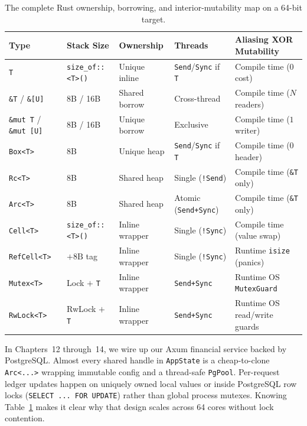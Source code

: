 \begin{table}[H]
\centering
\footnotesize
\setlength{\tabcolsep}{4pt}
\begin{tabular}{@{}llllp{4.3cm}@{}}
\toprule
\textbf{Type} & \textbf{Stack Size} & \textbf{Ownership} & \textbf{Threads} & \textbf{Aliasing XOR Mutability} \\
\midrule
\texttt{T} & \texttt{size\_of::<T>()} & Unique inline & \texttt{Send}/\texttt{Sync} if \texttt{T} & Compile time (0 cost) \\
\texttt{\&T} / \texttt{\&[U]} & 8B / 16B & Shared borrow & Cross-thread & Compile time ($N$ readers) \\
\texttt{\&mut T} / \texttt{\&mut [U]} & 8B / 16B & Unique borrow & Exclusive & Compile time ($1$ writer) \\
\texttt{Box<T>} & 8B & Unique heap & \texttt{Send}/\texttt{Sync} if \texttt{T} & Compile time (0 header) \\
\texttt{Rc<T>} & 8B & Shared heap & Single (\texttt{!Send}) & Compile time (\texttt{\&T} only) \\
\texttt{Arc<T>} & 8B & Shared heap & Atomic (\texttt{Send+Sync}) & Compile time (\texttt{\&T} only) \\
\texttt{Cell<T>} & \texttt{size\_of::<T>()} & Inline wrapper & Single (\texttt{!Sync}) & Compile time (value swap) \\
\texttt{RefCell<T>} & $+8\text{B}$ tag & Inline wrapper & Single (\texttt{!Sync}) & Runtime \texttt{isize} (panics) \\
\texttt{Mutex<T>} & Lock $+$ \texttt{T} & Inline wrapper & \texttt{Send+Sync} & Runtime OS \texttt{MutexGuard} \\
\texttt{RwLock<T>} & RwLock $+$ \texttt{T} & Inline wrapper & \texttt{Send+Sync} & Runtime OS read/write guards \\
\bottomrule
\end{tabular}
\caption{The complete Rust ownership, borrowing, and interior-mutability map on a 64-bit target.}
\label{ch03:tab-pointer-toolkit}
\end{table}

\begin{applicationbox}
In Chapters~12 through~14, we wire up our Axum financial service backed by PostgreSQL. Almost every shared handle in \texttt{AppState} is a cheap-to-clone \texttt{Arc<...>} wrapping immutable config and a thread-safe \texttt{PgPool}. Per-request ledger updates happen on uniquely owned local values or inside PostgreSQL row locks (\texttt{SELECT ... FOR UPDATE}) rather than global process mutexes. Knowing Table~\ref{ch03:tab-pointer-toolkit} makes it clear why that design scales across 64 cores without lock contention.
\end{applicationbox}


